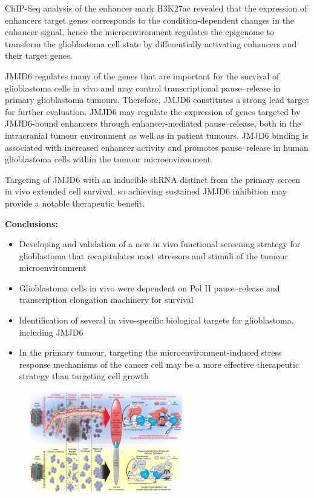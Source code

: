 ChIP-Seq analysis of the enhancer mark H3K27ac revealed that the expression of enhancers target genes corresponds to the condition-dependent changes in the enhancer signal, hence the microenvironment regulates the epigenome to transform the glioblastoma cell state by differentially activating enhancers and their target genes.

JMJD6 regulates many of the genes that are important for the survival of glioblastoma cells in vivo and may control transcriptional pause–release in primary glioblastoma tumours. Therefore, JMJD6 constitutes a strong lead target for further evaluation. JMJD6 may regulate the expression of genes targeted by JMJD6-bound enhancers through enhancer-mediated pause–release, both in the intracranial tumour environment as well as in patient tumours. JMJD6 binding is associated with increased enhancer activity and promotes pause–release in human glioblastoma cells within the tumour microenvironment.

Targeting of JMJD6 with an inducible shRNA distinct from the primary screen in vivo extended cell survival, so achieving sustained JMJD6 inhibition may provide a notable therapeutic benefit.

\textbf{Conclusions:}
\begin{itemize}
\tightlist
\item Developing and validation of a new in vivo functional screening strategy for glioblastoma that recapitulates most stressors and ­stimuli of the tumour microenvironment
\item Glioblastoma cells in vivo were dependent on Pol II pause–release and transcription elongation machinery for survival
\item Identification of several in vivo-specific biological targets for glioblastoma, including JMJD6
\item In the primary tumour, targeting the microenvironment-induced stress response mechanisms of the cancer cell may be a more effective therapeutic strategy than targeting cell growth
\end{itemize}

\begin{figure}
\centering
\includegraphics[width=0.6\textwidth]{../_resources/RNAi.png}
\caption{}
\end{figure}


